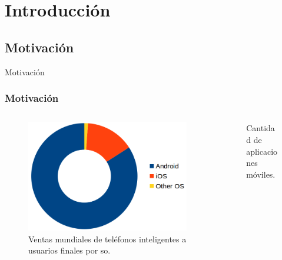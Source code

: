 \section{Introducción}
\subsection{Motivación}
\begin{frame}
 \begin{center}
  \LARGE Motivación
 \end{center}
\end{frame}
\begin{frame}
 \frametitle{Motivación}
 \begin{columns}
  \begin{column}[]{.40\textwidth}
   \begin{figure}[H]
    \includegraphics[scale=.15]{imgs/mobile-so-proportion.png} 
    \caption{Ventas mundiales de teléfonos inteligentes a usuarios finales por so.}
    \label{mobile-so}
   \end{figure}
  \end{column}
  \begin{column}[]{.55\textwidth}\pause
   \begin{figure}
     \centering
     \caption{Cantidad de aplicaciones móviles.}
     \label{amount-apps}
   \end{figure}
  \end{column}
 \end{columns}
\end{frame}
